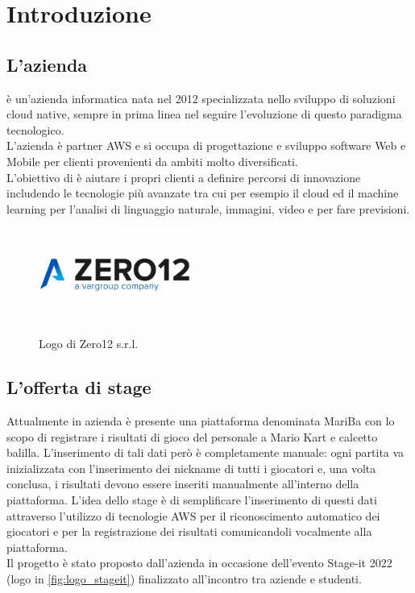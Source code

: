
\chapter{Introduzione}
\label{cap:introduzione}

\section{L'azienda}

\azienda è un'azienda informatica nata nel 2012 specializzata nello sviluppo di soluzioni cloud native, sempre in prima linea nel seguire l'evoluzione di questo paradigma tecnologico. \\
L'azienda è partner \gls{AWS} e si occupa di progettazione e sviluppo software Web e Mobile per clienti provenienti da ambiti molto diversificati. \\
L'obiettivo di \azienda è aiutare i propri clienti a definire percorsi di innovazione includendo le tecnologie più avanzate tra cui per esempio
il cloud ed il machine learning per l'analisi di linguaggio naturale, immagini, video e per fare previsioni. 

	\begin{figure}[H]
		\centering
		\includegraphics[width=5cm]{immagini/logo-zero12.png} \\
		\caption{\label{fig:logo_zero12} Logo di Zero12 s.r.l.}
	\end{figure}

\section{L'offerta di stage}
	Attualmente in azienda è presente una piattaforma denominata MariBa con lo scopo di registrare i risultati di gioco del personale a Mario Kart e calcetto balilla. L'inserimento di tali dati però è completamente manuale: ogni partita va
	inizializzata con l'inserimento dei nickname di tutti i giocatori e, una volta conclusa, i risultati devono
	essere inseriti manualmente all'interno della piattaforma. L'idea dello stage è di semplificare l'inserimento di questi
	dati attraverso l'utilizzo di tecnologie \gls{AWS} per il riconoscimento automatico dei giocatori e per la registrazione dei risultati comunicandoli vocalmente alla piattaforma. \\
	Il progetto è stato proposto dall'azienda in occasione dell'evento Stage-it 2022 (logo in \autoref{fig:logo_stageit}) finalizzato all'incontro tra aziende e studenti.
	
